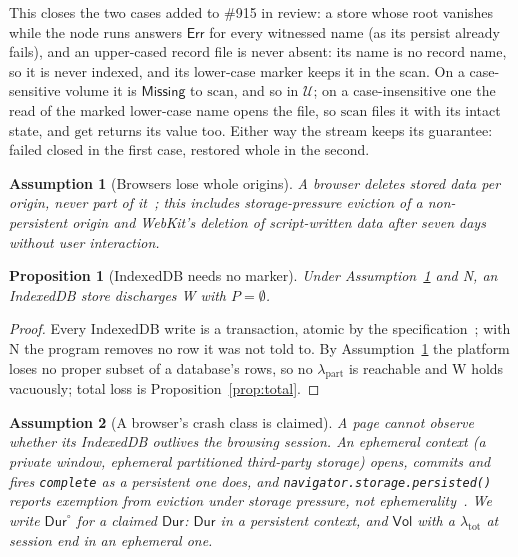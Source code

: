 \documentclass[journal]{IEEEtran}
\newtheorem{assumption}{Assumption}
\newtheorem{proposition}{Proposition}
\newcommand{\Err}{\mathsf{Err}}
\newcommand{\Missing}{\mathsf{Missing}}
\newcommand{\Volatile}{\mathsf{Vol}}
\newcommand{\Durable}{\mathsf{Dur}}
\newcommand{\U}{\mathcal{U}}
\newcommand{\issue}[1]{\#{#1}}
\newcommand{\jsq}[1]{\texttt{#1}}
\begin{document}
This closes the two cases added to \issue{915} in review: a store whose root vanishes while
the node runs answers $\Err$ for every witnessed name (as its persist already fails), and an
upper-cased record file is never absent: its name is no record name, so it is never indexed,
and its lower-case marker keeps it in the scan.  On a case-sensitive volume it is
$\Missing$ to $\mathrm{scan}$, and so in $\U$; on a case-insensitive one the read of the
marked lower-case name opens the file, so $\mathrm{scan}$ files it with its intact state, and
$\mathrm{get}$ returns its value too.  Either way the stream keeps its guarantee: failed closed
in the first case, restored whole in the second.

\begin{assumption}[Browsers lose whole origins]\label{as:idbloss}
A browser deletes stored data per origin, never part of it~\cite{MDNEviction}; this
includes storage-pressure eviction of a non-persistent origin and WebKit's deletion of
script-written data after seven days without user interaction.
\end{assumption}

\begin{proposition}[IndexedDB needs no marker]\label{prop:idbwitness}
Under Assumption~\ref{as:idbloss} and N, an IndexedDB store discharges W with $P=\emptyset$.
\end{proposition}
\begin{proof}
Every IndexedDB write is a transaction, atomic by the specification~\cite{IndexedDB3}; with
N the program removes no row it was not told to.  By Assumption~\ref{as:idbloss} the
platform loses no proper subset of a database's rows, so no $\lambda_{\mathrm{part}}$ is
reachable and W holds vacuously; total loss is Proposition~\ref{prop:total}.
\end{proof}

\begin{assumption}[A browser's crash class is claimed]\label{as:claimed}
A page cannot observe whether its IndexedDB outlives the browsing session.  An ephemeral
context (a private window, ephemeral partitioned third-party storage) opens, commits and
fires \jsq{complete} as a persistent one does, and \jsq{navigator.storage.persisted()}
reports exemption from eviction under storage pressure, not
ephemerality~\cite{MDNEviction}.  We write $\Durable^{\circ}$ for a claimed $\Durable$:
$\Durable$ in a persistent context, and $\Volatile$ with a $\lambda_{\mathrm{tot}}$ at
session end in an ephemeral one.
\end{assumption}
\end{document}
